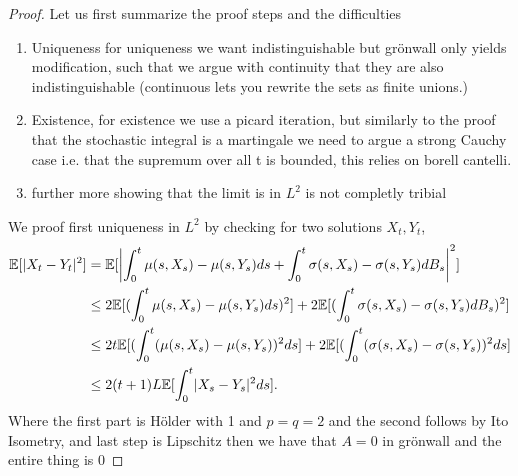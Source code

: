 \begin{proof}
  Let us first summarize the proof steps and the difficulties 
  \begin{enumerate}
    \item Uniqueness for uniqueness we want indistinguishable but grönwall only yields modification, 
      such that we argue with continuity that they are also indistinguishable (continuous lets you rewrite the sets as finite unions.)
    \item Existence, for existence we use a picard iteration,  but similarly to the proof that the stochastic integral is a martingale 
      we need to argue a strong Cauchy case i.e. that the supremum over all t is bounded, this relies on borell cantelli.
    \item further more showing that the limit is in $L^2$ is not completly tribial
  \end{enumerate}
 We proof first uniqueness in $L^2$ by checking  for two solutions $X_t , Y_t$,
 \begin{align*}
   \E[\abs{X_t-Y_t}^2]  &=\E[\abs*{\int_0^{t} \mu(s,X_s)-\mu(s,Y_s) ds + \int_0^{t} \sigma(s,X_s) -\sigma(s,Y_s) dB_s }^2 ]\\
                        &\le 2\E[(\int_0^{t}\mu(s,X_s) - \mu(s,Y_s) ds )^2] + 2\E[(\int_0^{t}\sigma (s,X_s) - \sigma(s,Y_s) dB_s )^2]\\
                        &\le 2t\E[(\int_0^{t}(\mu(s,X_s) - \mu(s,Y_s))^2 ds] + 2\E[(\int_0^{t}(\sigma (s,X_s) - \sigma(s,Y_s))^2 ds ]\\
                        &\le 2(t+1)L\E[\int_0^{t} \abs{X_s-Y_s}^2 ds ]
 .\end{align*}
 Where the first part is Hölder with 1 and $p=q=2$ and the second follows by Ito Isometry, and last step is Lipschitz
 then we have that $A=0$ in grönwall and the entire thing is $0$
\end{proof}

